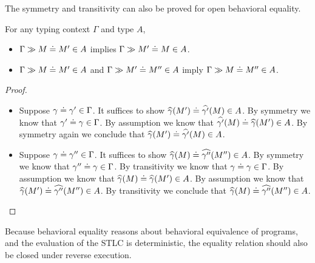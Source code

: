 \documentclass{article}
\newcommand{\G}{\Gamma}
\begin{document}
The symmetry and transitivity can also be proved for open behavioral equality.

\begin{lemma} \label{lem:typingsymtran}
For any typing context $\G$ and type $A$,
\begin{itemize}
    \item $\G \gg M \eeq M' \in A$ implies $\G \gg M' \eeq M \in A$.
    \item $\G \gg M \eeq M' \in A$ and $\G \gg M' \eeq M'' \in A$ imply $\G \gg M \eeq M'' \in A$.
\end{itemize}
\end{lemma}
\begin{proof}
\begin{itemize}
    \item Suppose $\gamma \eeq \gamma' \in \G$.
    It suffices to show $\widehat{\gamma}(M') \doteq \widehat{\gamma'}(M) \in A$.
    By symmetry we know that $\gamma' \eeq \gamma \in \G$.
    By assumption we know that $\widehat{\gamma'}(M) \doteq \widehat{\gamma}(M') \in A$.
    By symmetry again we conclude that $\widehat{\gamma}(M') \doteq \widehat{\gamma'}(M) \in A$.
    \item Suppose $\gamma \eeq \gamma'' \in \G$.
    It suffices to show $\widehat{\gamma}(M) \doteq \widehat{\gamma''}(M'') \in A$.
    By symmetry we know that $\gamma'' \eeq \gamma \in \G$.
    By transitivity we know that $\gamma \eeq \gamma \in \G$.
    By assumption we know that $\widehat{\gamma}(M) \doteq \widehat{\gamma}(M') \in A$.
    By assumption we know that $\widehat{\gamma}(M') \doteq \widehat{\gamma''}(M'') \in A$.
    By transitivity we conclude that $\widehat{\gamma}(M) \doteq \widehat{\gamma''}(M'') \in A$.
\end{itemize}
\end{proof}

Because behavioral equality reasons about behavioral equivalence of programs, and the evaluation of the STLC is deterministic, the equality relation should also be closed under reverse execution.
\end{document}
